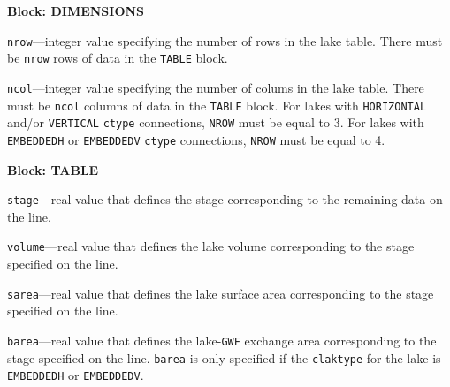 
\item \textbf{Block: DIMENSIONS}

\begin{description}
\item \texttt{nrow}---integer value specifying the number of rows in the lake table. There must be \texttt{nrow} rows of data in the \texttt{TABLE} block.

\item \texttt{ncol}---integer value specifying the number of colums in the lake table. There must be \texttt{ncol} columns of data in the \texttt{TABLE} block. For lakes with \texttt{HORIZONTAL} and/or \texttt{VERTICAL} \texttt{ctype} connections, \texttt{NROW} must be equal to 3. For lakes with \texttt{EMBEDDEDH} or \texttt{EMBEDDEDV} \texttt{ctype} connections, \texttt{NROW} must be equal to 4.

\end{description}
\item \textbf{Block: TABLE}

\begin{description}
\item \texttt{stage}---real value that defines the stage corresponding to the remaining data on the line.

\item \texttt{volume}---real value that defines the lake volume corresponding to the stage specified on the line.

\item \texttt{sarea}---real value that defines the lake surface area corresponding to the stage specified on the line.

\item \texttt{barea}---real value that defines the lake-\texttt{GWF} exchange area corresponding to the stage specified on the line. \texttt{barea} is only specified if the \texttt{claktype} for the lake is \texttt{EMBEDDEDH} or \texttt{EMBEDDEDV}.

\end{description}

